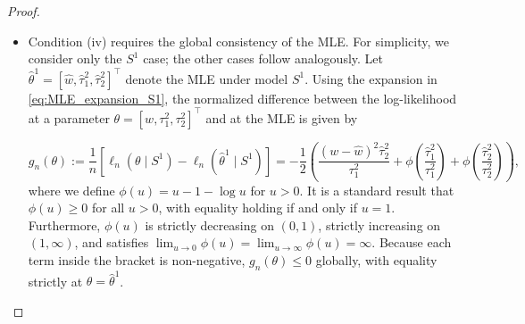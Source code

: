 \documentclass[accepted]{uai2026} %
\theoremstyle{boldremark}
\begin{document}
\begin{proof}
\begin{itemize}
            with determinant

            $$\det(H(\theta)) = -\frac{n^3\hat{\tau}_2^2}{4\tau_1^6\tau_2^4}\Big(1-\frac{2\hat{\tau}_2^2}{\tau_2^2}\Big)\Big(1-\frac{2\hat{\tau}_1^2}{\tau_1^2}\Big).$$
            
            For simplicity we define the normalized determinant function $h(\theta) = n^{-3} \det(H(\theta))$. The determinant evaluated at the MLE is $\det(H(\hat{\theta})) = -n^3 / (4 \hat{\tau}_1^6 \hat{\tau}_2^4)$, which implies that $h(\hat{\theta}) = -1/(4 \hat{\tau}_1^6 \hat{\tau}_2^4) := -C < 0$, where $C$ is a positive constant with probability 1. 
            
            The components of the Hessian matrix are linear combinations of rational functions of the variance parameters and polynomial functions of $w$. Since the variances are strictly positive in the parameter space $\Theta$, the determinant is a continuous function of $\theta$.  Moreover, $\hat{\tau}_1^2$ and $\hat{\tau}_2^2>0$ a.s. By the definition of continuity, for any $\delta > 0$, there exists an $\epsilon > 0$ such that $|h(\theta) - h(\hat{\theta})| < \delta$ for all $\theta \in B_\epsilon(\hat{\theta})$. Choosing $\delta = C/2$, we obtain $h(\theta) < -C + C/2 = -C/2 < 0$ for all $\theta$ in this neighborhood. This strictly negative upper bound ensures that the condition $\limsup_{n \to \infty} \sup_{\theta \in B_\epsilon(\hat{\theta})} \{ n^{-1} \det(H(\theta)) \} < 0$ is satisfied with probability one.

        \item[(iv)] 

Condition (iv) requires the global consistency of the MLE. For simplicity, we consider only the $S^1$ case; the other cases follow analogously. Let $\hat{\theta}^1 = [\hat{w}, \hat{\tau}_1^2, \hat{\tau}_2^2]^\top$ denote the MLE under model $S^1$. Using the expansion in \eqref{eq:MLE_expansion_S1}, the normalized difference between the log-likelihood at a parameter $\theta = [w, \tau_1^2, \tau_2^2]^\top$ and at the MLE is given by

\begin{equation*}
g_n(\theta) := \frac{1}{n}\left[\ell_n(\theta \mid S^1) - \ell_n(\hat{\theta}^1 \mid S^1) \right] = -\frac{1}{2} \left( \frac{(w-\hat{w})^2\hat{\tau}^2_2}{\tau_1^2} + \phi\left(\frac{\hat{\tau}_1^2}{\tau_1^2}\right) + \phi\left(\frac{\hat{\tau}_2^2}{\tau_2^2}\right) \right),
\end{equation*}
where we define $\phi(u) = u - 1 - \log u$ for $u > 0$. It is a standard result that $\phi(u) \geq 0$ for all $u > 0$, with equality holding if and only if $u = 1$. Furthermore, $\phi(u)$ is strictly decreasing on $(0, 1)$, strictly increasing on $(1, \infty)$, and satisfies $\lim_{u \to 0}\phi(u) = \lim_{u\to \infty} \phi(u) = \infty$. Because each term inside the bracket is non-negative, $g_n(\theta) \leq 0$ globally, with equality strictly at $\theta = \hat{\theta}^1$.


\end{itemize}
\end{proof}
\end{document}
